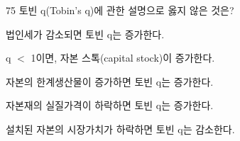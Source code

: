 \begin{question}{75}
토빈 q(Tobin's q)에 관한 설명으로 옳지 않은 것은?
\begin{choices}
  \item 법인세가 감소되면 토빈 q는 증가한다.
  \item q $<$ 1이면, 자본 스톡(capital stock)이 증가한다.
  \item 자본의 한계생산물이 증가하면 토빈 q는 증가한다.
  \item 자본재의 실질가격이 하락하면 토빈 q는 증가한다.
  \item 설치된 자본의 시장가치가 하락하면 토빈 q는 감소한다.
\end{choices}
\end{question}
